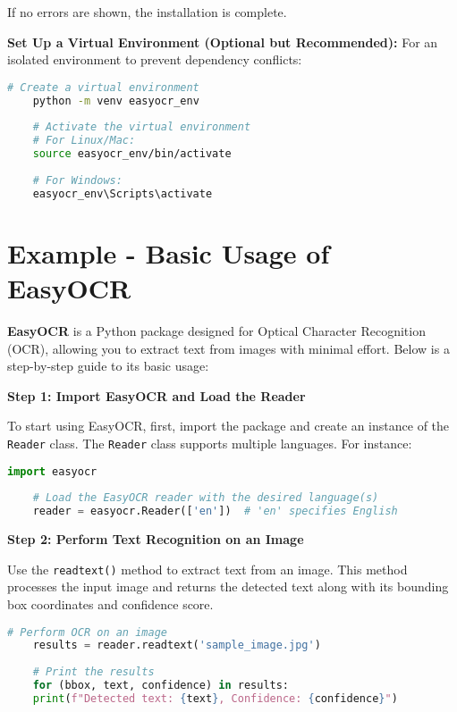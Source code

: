 If no errors are shown, the installation is complete.

\textbf{Set Up a Virtual Environment (Optional but Recommended):} For an isolated environment to prevent dependency conflicts: \cite{Mahajan:2023}

\begin{lstlisting}[language=bash, caption=Setting Up a Virtual Environment]
	# Create a virtual environment
	python -m venv easyocr_env
	
	# Activate the virtual environment
	# For Linux/Mac:
	source easyocr_env/bin/activate
	
	# For Windows:
	easyocr_env\Scripts\activate
\end{lstlisting}

\section{Example - Basic Usage of EasyOCR}

\textbf{EasyOCR} is a Python package designed for Optical Character Recognition (OCR), allowing you to extract text from images with minimal effort. Below is a step-by-step guide to its basic usage:

\textbf{Step 1: Import EasyOCR and Load the Reader} 

To start using EasyOCR, first, import the package and create an instance of the \texttt{Reader} class. The \texttt{Reader} class supports multiple languages. For instance:\cite{Mahajan:2023} 

\begin{lstlisting}[language=Python, caption=Importing EasyOCR and Loading the Reader]
	import easyocr
	
	# Load the EasyOCR reader with the desired language(s)
	reader = easyocr.Reader(['en'])  # 'en' specifies English
\end{lstlisting}

\textbf{Step 2: Perform Text Recognition on an Image} 

Use the \texttt{readtext()} method to extract text from an image. This method processes the input image and returns the detected text along with its bounding box coordinates and confidence score.

\begin{lstlisting}[language=Python, caption=Recognizing Text from an Image]
	# Perform OCR on an image
	results = reader.readtext('sample_image.jpg')
	
	# Print the results
	for (bbox, text, confidence) in results:
	print(f"Detected text: {text}, Confidence: {confidence}")
\end{lstlisting}

